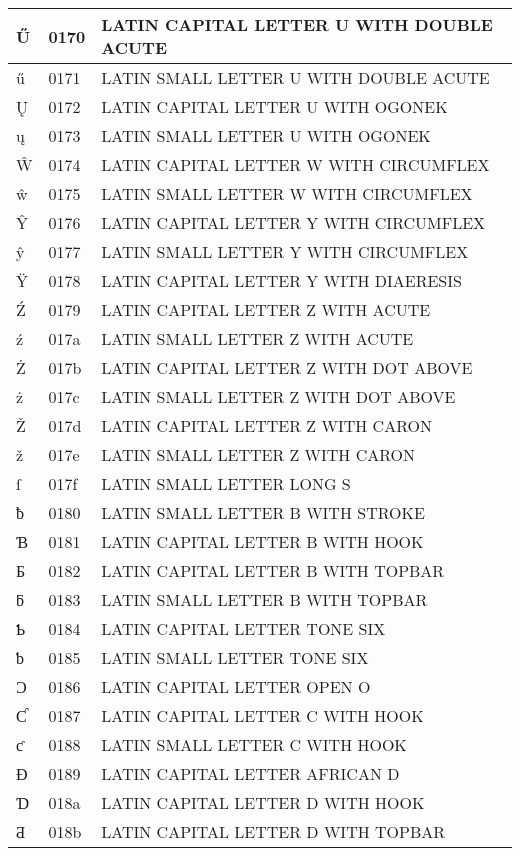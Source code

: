 \documentclass[12pt,letterpaper,openany]{book}
\begin{document}
\begin{center}
\begin{supertabular}{|m{0.25in}|m{0.5in}|m{4in}|}
Ű & 0170 & LATIN CAPITAL LETTER U WITH DOUBLE ACUTE\\\hline
ű & 0171 & LATIN SMALL LETTER U WITH DOUBLE ACUTE\\\hline
Ų & 0172 & LATIN CAPITAL LETTER U WITH OGONEK\\\hline
ų & 0173 & LATIN SMALL LETTER U WITH OGONEK\\\hline
Ŵ & 0174 & LATIN CAPITAL LETTER W WITH CIRCUMFLEX\\\hline
ŵ & 0175 & LATIN SMALL LETTER W WITH CIRCUMFLEX\\\hline
Ŷ & 0176 & LATIN CAPITAL LETTER Y WITH CIRCUMFLEX\\\hline
ŷ & 0177 & LATIN SMALL LETTER Y WITH CIRCUMFLEX\\\hline
Ÿ & 0178 & LATIN CAPITAL LETTER Y WITH DIAERESIS\\\hline
Ź & 0179 & LATIN CAPITAL LETTER Z WITH ACUTE\\\hline
ź & 017a & LATIN SMALL LETTER Z WITH ACUTE\\\hline
Ż & 017b & LATIN CAPITAL LETTER Z WITH DOT ABOVE\\\hline
ż & 017c & LATIN SMALL LETTER Z WITH DOT ABOVE\\\hline
Ž & 017d & LATIN CAPITAL LETTER Z WITH CARON\\\hline
ž & 017e & LATIN SMALL LETTER Z WITH CARON\\\hline
ſ & 017f & LATIN SMALL LETTER LONG S\\\hline
ƀ & 0180 & LATIN SMALL LETTER B WITH STROKE\\\hline
Ɓ & 0181 & LATIN CAPITAL LETTER B WITH HOOK\\\hline
Ƃ & 0182 & LATIN CAPITAL LETTER B WITH TOPBAR\\\hline
ƃ & 0183 & LATIN SMALL LETTER B WITH TOPBAR\\\hline
Ƅ & 0184 & LATIN CAPITAL LETTER TONE SIX\\\hline
ƅ & 0185 & LATIN SMALL LETTER TONE SIX\\\hline
Ɔ & 0186 & LATIN CAPITAL LETTER OPEN O\\\hline
Ƈ & 0187 & LATIN CAPITAL LETTER C WITH HOOK\\\hline
ƈ & 0188 & LATIN SMALL LETTER C WITH HOOK\\\hline
Ɖ & 0189 & LATIN CAPITAL LETTER AFRICAN D\\\hline
Ɗ & 018a & LATIN CAPITAL LETTER D WITH HOOK\\\hline
Ƌ & 018b & LATIN CAPITAL LETTER D WITH TOPBAR\\\hline

\end{supertabular}
\end{center}
\end{document}
